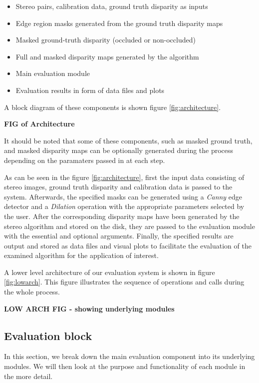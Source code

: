 \begin{itemize}
\item Stereo pairs, calibration data, ground truth disparity as inputs
\item Edge region masks generated from the ground truth disparity maps
\item Masked ground-truth disparity (occluded or non-occluded)
\item Full and masked disparity maps generated by the algorithm 
\item Main evaluation module
\item Evaluation results in form of data files and plots
\end{itemize}

A block diagram of these components is shown figure \ref{fig:architecture}.

\textbf{FIG of Architecture}

It should be noted that some of these components, such as masked ground truth, and masked disparity maps 
can be optionally generated during the process depending on the paramaters passed in at each step.

As can be seen in the figure \ref{fig:architecture}, first the input data consisting of stereo images, ground truth disparity and calibration data is passed
to the system.
Afterwards, the specified masks can be generated using a \textit{Canny} edge detector and a \textit{Dilation} operation with the appropriate parameters 
selected by the user.
After the corresponding disparity maps have been generated by the stereo algorithm and stored on the disk, 
they are passed to the evaluation module with the essential and optional arguments.
Finally, the specified results are output and stored as data files and visual plots to facilitate the evaluation of the examined algorithm for the application
of interest.

A lower level architecture of our evaluation system is shown in figure \ref{fig:lowarch}. This figure illustrates the 
sequence of operations and calls during the whole process. 

\textbf{LOW ARCH FIG - showing underlying modules}

\subsection{Evaluation block}
In this section, we break down the main evaluation component into its underlying modules. We will then look at the purpose and functionality of each
module in the more detail.

